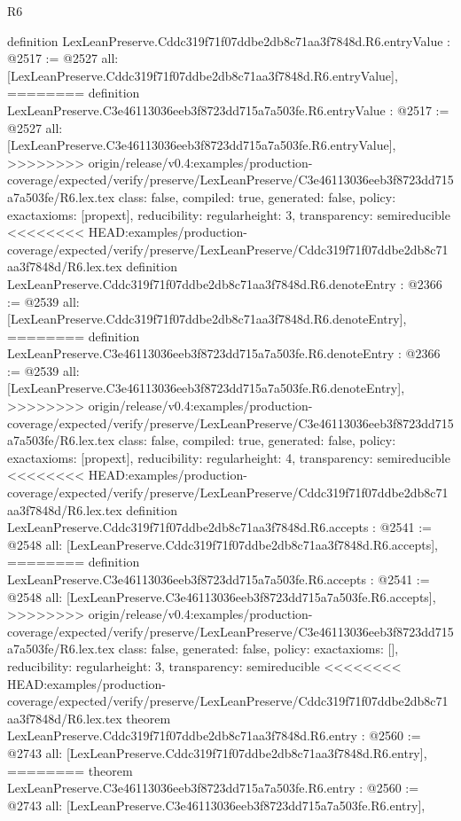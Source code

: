 \begin{lexlean}{R6}
\begin{coremodule}
{{{{{{{{{{{{{{definition LexLeanPreserve.Cddc319f71f07ddbe2db8c71aa3f7848d.R6.entryValue : @2517 := @2527 {
  all: [LexLeanPreserve.Cddc319f71f07ddbe2db8c71aa3f7848d.R6.entryValue],
========
definition LexLeanPreserve.C3e46113036eeb3f8723dd715a7a503fe.R6.entryValue : @2517 := @2527 {
  all: [LexLeanPreserve.C3e46113036eeb3f8723dd715a7a503fe.R6.entryValue],
>>>>>>>> origin/release/v0.4:examples/production-coverage/expected/verify/preserve/LexLeanPreserve/C3e46113036eeb3f8723dd715a7a503fe/R6.lex.tex
  class: false,
  compiled: true,
  generated: false,
  policy: exact{axioms: [propext]},
  reducibility: regular{height: 3},
  transparency: semireducible
}
<<<<<<<< HEAD:examples/production-coverage/expected/verify/preserve/LexLeanPreserve/Cddc319f71f07ddbe2db8c71aa3f7848d/R6.lex.tex
definition LexLeanPreserve.Cddc319f71f07ddbe2db8c71aa3f7848d.R6.denoteEntry : @2366 := @2539 {
  all: [LexLeanPreserve.Cddc319f71f07ddbe2db8c71aa3f7848d.R6.denoteEntry],
========
definition LexLeanPreserve.C3e46113036eeb3f8723dd715a7a503fe.R6.denoteEntry : @2366 := @2539 {
  all: [LexLeanPreserve.C3e46113036eeb3f8723dd715a7a503fe.R6.denoteEntry],
>>>>>>>> origin/release/v0.4:examples/production-coverage/expected/verify/preserve/LexLeanPreserve/C3e46113036eeb3f8723dd715a7a503fe/R6.lex.tex
  class: false,
  compiled: true,
  generated: false,
  policy: exact{axioms: [propext]},
  reducibility: regular{height: 4},
  transparency: semireducible
}
<<<<<<<< HEAD:examples/production-coverage/expected/verify/preserve/LexLeanPreserve/Cddc319f71f07ddbe2db8c71aa3f7848d/R6.lex.tex
definition LexLeanPreserve.Cddc319f71f07ddbe2db8c71aa3f7848d.R6.accepts : @2541 := @2548 {
  all: [LexLeanPreserve.Cddc319f71f07ddbe2db8c71aa3f7848d.R6.accepts],
========
definition LexLeanPreserve.C3e46113036eeb3f8723dd715a7a503fe.R6.accepts : @2541 := @2548 {
  all: [LexLeanPreserve.C3e46113036eeb3f8723dd715a7a503fe.R6.accepts],
>>>>>>>> origin/release/v0.4:examples/production-coverage/expected/verify/preserve/LexLeanPreserve/C3e46113036eeb3f8723dd715a7a503fe/R6.lex.tex
  class: false,
  generated: false,
  policy: exact{axioms: []},
  reducibility: regular{height: 3},
  transparency: semireducible
}
<<<<<<<< HEAD:examples/production-coverage/expected/verify/preserve/LexLeanPreserve/Cddc319f71f07ddbe2db8c71aa3f7848d/R6.lex.tex
theorem LexLeanPreserve.Cddc319f71f07ddbe2db8c71aa3f7848d.R6.entry : @2560 := @2743 {
  all: [LexLeanPreserve.Cddc319f71f07ddbe2db8c71aa3f7848d.R6.entry],
========
theorem LexLeanPreserve.C3e46113036eeb3f8723dd715a7a503fe.R6.entry : @2560 := @2743 {
  all: [LexLeanPreserve.C3e46113036eeb3f8723dd715a7a503fe.R6.entry],
}}}}}}}}}}}}}}}}}}}
\end{coremodule}
\end{lexlean}
